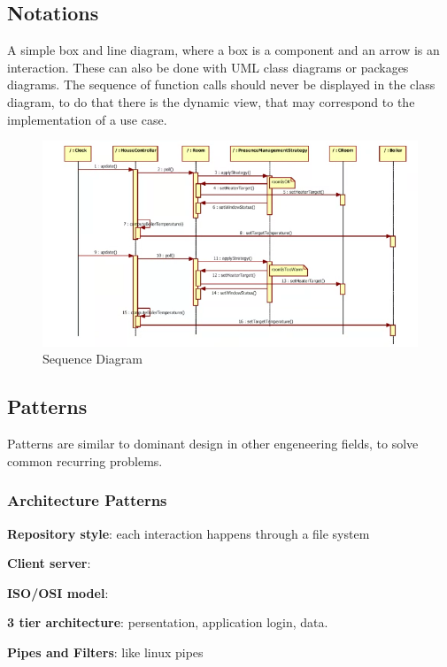 \documentclass[12pt]{article}
\begin{document}
\subsection{Notations}
A simple box and line diagram, where a box is a component and an arrow is an interaction. These can also be done with UML class diagrams or packages diagrams. The sequence of function calls should never be displayed in the class diagram, to do that there is the dynamic view, that may correspond to the implementation of a use case.
\begin{figure}
  \centering
  \includegraphics[width=1\linewidth]{sequence-diagram.png}
  \caption{Sequence Diagram}
  \label{fig:sequence-diagram}
\end{figure}




\subsection{Patterns}
Patterns are similar to dominant design in other engeneering fields, to solve common recurring problems. 

\subsubsection{Architecture Patterns}
\textbf{Repository style}: each interaction happens through a file system

\textbf{Client server}:

\textbf{ISO/OSI model}:

\textbf{3 tier architecture}: persentation, application login, data.

\textbf{Pipes and Filters}: like linux pipes
\end{document}
